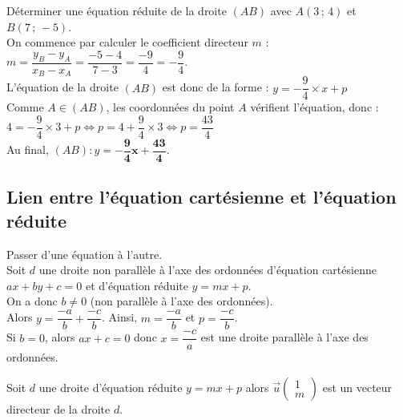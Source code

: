 \begin{Exemple}
Déterminer une équation réduite de la droite $(AB)$ avec $A(3\,;\,4)$ et $B(7\,;\,-5)$. \\
On commence par calculer le coefficient directeur $m$ :\\ $m=\dfrac{y_B-y_A}{x_B-x_A}=\dfrac{-5-4}{7-3}=\dfrac{-9}{4}=-\dfrac{9}{4}$. \\

L'équation de la droite $(AB)$ est donc de la forme : $y=-\dfrac{9}{4} \times x+p$\\

Comme $A \in (AB)$, les coordonnées du point $A$ vérifient l'équation, donc :\\
$4=-\dfrac{9}{4} \times 3 +p\iff p=4+\dfrac{9}{4} \times 3\iff p=\dfrac{43}{4}$\\
Au final, $(AB) : y = {\boldsymbol{-\dfrac{9}{4}x+\dfrac{43}{4}}}$.


\end{Exemple}

\subsection{Lien entre l'équation cartésienne et l'équation réduite}
\begin{Méthode}Passer d'une équation à l'autre. \\
Soit $d$ une droite non parallèle à l'axe des ordonnées d'équation cartésienne $ax+by+c=0$ et d'équation réduite $y=mx+p$. \\
On a donc $b\neq 0$ (non parallèle à l'axe des ordonnées).\\
Alors $y=\dfrac{-a}{b}+\dfrac{-c}{b}$. Ainsi, $m=\dfrac{-a}{b}$ et $p=\dfrac{-c}{b}$.\\
Si $b=0$, alors $ax+c=0$ donc $x=\dfrac{-c}{a}$ est une droite parallèle à l'axe des ordonnées.
\end{Méthode}

\begin{Propriété}
Soit $d$ une droite d'équation réduite $y=mx+p$ alors $\overrightarrow{u}\begin{pmatrix}
1 \\
m\end{pmatrix}$ est un vecteur directeur de la droite $d$.
\end{Propriété}

